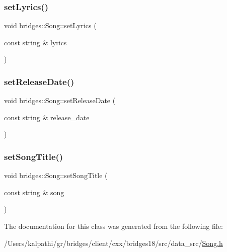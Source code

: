 \mbox{\label{classbridges_1_1_song_af32f02057c6dd253ea4e8d002e548cf2}} 
\subsubsection{\texorpdfstring{set\+Lyrics()}{setLyrics()}}
{\footnotesize\ttfamily void bridges\+::\+Song\+::set\+Lyrics (\begin{DoxyParamCaption}\item[{const string \&}]{lyrics }\end{DoxyParamCaption})\hspace{0.3cm}{\ttfamily [inline]}}

\mbox{\label{classbridges_1_1_song_a492a14035331c66652488c4f222aa7b3}} 
\subsubsection{\texorpdfstring{set\+Release\+Date()}{setReleaseDate()}}
{\footnotesize\ttfamily void bridges\+::\+Song\+::set\+Release\+Date (\begin{DoxyParamCaption}\item[{const string \&}]{release\+\_\+date }\end{DoxyParamCaption})\hspace{0.3cm}{\ttfamily [inline]}}

\mbox{\label{classbridges_1_1_song_a18e3a6bd5f424a6dadf529bed446a0d0}} 
\subsubsection{\texorpdfstring{set\+Song\+Title()}{setSongTitle()}}
{\footnotesize\ttfamily void bridges\+::\+Song\+::set\+Song\+Title (\begin{DoxyParamCaption}\item[{const string \&}]{song }\end{DoxyParamCaption})\hspace{0.3cm}{\ttfamily [inline]}}



The documentation for this class was generated from the following file\+:\begin{DoxyCompactItemize}
\item 
/\+Users/kalpathi/gr/bridges/client/cxx/bridges18/src/data\+\_\+src/\mbox{\hyperlink{_song_8h}{Song.\+h}}\end{DoxyCompactItemize}
